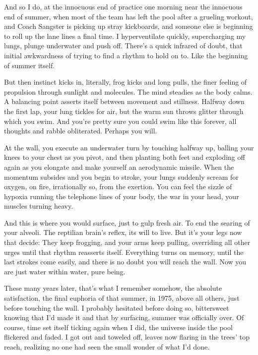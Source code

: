 And so I do, at the innocuous end of practice one morning near the
innocuous end of summer, when most of the team has left the pool after a
grueling workout, and Coach Sangster is picking up stray kickboards, and
someone else is beginning to roll up the lane lines a final time. I
hyperventilate quickly, supercharging my lungs, plunge underwater and
push off. There's a quick infrared of doubt, that initial awkwardness of
trying to find a rhythm to hold on to. Like the beginning of summer
itself.

But then instinct kicks in, literally, frog kicks and long pulls, the
finer feeling of propulsion through sunlight and molecules. The mind
steadies as the body calms. A balancing point asserts itself between
movement and stillness. Halfway down the first lap, your lung tickles
for air, but the warm sun throws glitter through which you swim. And
you're pretty sure you could swim like this forever, all thoughts and
rabble obliterated. Perhaps you will.

At the wall, you execute an underwater turn by touching halfway up,
balling your knees to your chest as you pivot, and then planting both
feet and exploding off again as you elongate and make yourself an
aerodynamic missile. When the momentum subsides and you begin to stroke,
your lungs suddenly scream for oxygen, on fire, irrationally so, from
the exertion. You can feel the sizzle of hypoxia running the telephone
lines of your body, the war in your head, your muscles turning heavy.

And this is where you would surface, just to gulp fresh air. To end the
searing of your alveoli. The reptilian brain's reflex, its will to live.
But it's your legs now that decide: They keep frogging, and your arms
keep pulling, overriding all other urges until that rhythm reasserts
itself. Everything turns on memory, until the last strokes come easily,
and there is no doubt you will reach the wall. Now you are just water
within water, pure being.

These many years later, that's what I remember somehow, the absolute
satisfaction, the final euphoria of that summer, in 1975, above all
others, just before touching the wall. I probably hesitated before doing
so, bittersweet knowing that I'd made it and that by surfacing, summer
was officially over. Of course, time set itself ticking again when I
did, the universe inside the pool flickered and faded. I got out and
toweled off, leaves now flaring in the trees' top reach, realizing no
one had seen the small wonder of what I'd done.

